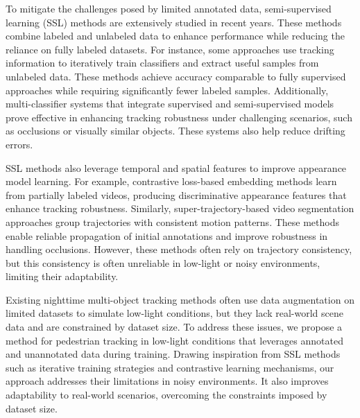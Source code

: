 To mitigate the challenges posed by limited annotated data, semi-supervised learning (SSL) methods are extensively studied in recent years. These methods combine labeled and unlabeled data to enhance performance while reducing the reliance on fully labeled datasets. For instance, some approaches use tracking information to iteratively train classifiers and extract useful samples from unlabeled data. These methods achieve accuracy comparable to fully supervised approaches while requiring significantly fewer labeled samples\cite{teichman2012tracking}. Additionally, multi-classifier systems that integrate supervised and semi-supervised models prove effective in enhancing tracking robustness under challenging scenarios, such as occlusions or visually similar objects. These systems also help reduce drifting errors\cite{stalder2009beyond}.

SSL methods also leverage temporal and spatial features to improve appearance model learning. For example, contrastive loss-based embedding methods learn from partially labeled videos, producing discriminative appearance features that enhance tracking robustness\cite{li2021semi}. Similarly, super-trajectory-based video segmentation approaches group trajectories with consistent motion patterns. These methods enable reliable propagation of initial annotations and improve robustness in handling occlusions\cite{wang2018semi}. However, these methods often rely on trajectory consistency, but this consistency is often unreliable in low-light or noisy environments, limiting their adaptability.

Existing nighttime multi-object tracking methods\cite{yi2024comprehensive,wang2024multi} often use data augmentation on limited datasets to simulate low-light conditions, but they lack real-world scene data and are constrained by dataset size. To address these issues, we propose a method for pedestrian tracking in low-light conditions that leverages annotated and unannotated data during training. Drawing inspiration from SSL methods such as iterative training strategies\cite{teichman2012tracking} and contrastive learning mechanisms\cite{li2021semi}, our approach addresses their limitations in noisy environments. It also improves adaptability to real-world scenarios, overcoming the constraints imposed by dataset size.